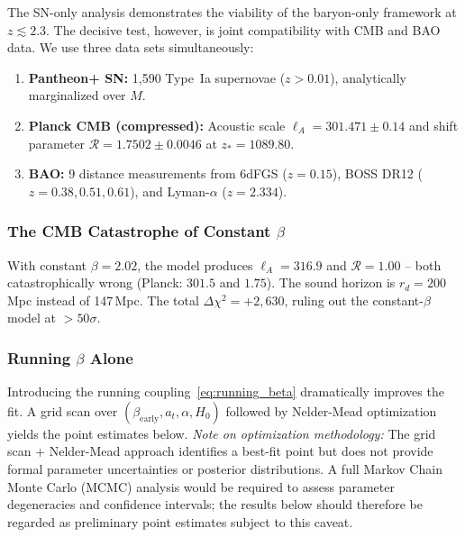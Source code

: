 \documentclass[aps,prd,twocolumn,superscriptaddress,nofootinbib,floatfix]{revtex4-2}
\begin{document}
The SN-only analysis demonstrates the viability of the baryon-only framework at $z \lesssim 2.3$. The decisive test, however, is joint compatibility with CMB and BAO data. We use three data sets simultaneously:

\begin{enumerate}
\item \textbf{Pantheon+ SN:} 1,590 Type~Ia supernovae ($z > 0.01$), analytically marginalized over $M$.
\item \textbf{Planck CMB (compressed):} Acoustic scale $\ell_A = 301.471 \pm 0.14$ and shift parameter $\mathcal{R} = 1.7502 \pm 0.0046$ at $z_* = 1089.80$.
\item \textbf{BAO:} 9 distance measurements from 6dFGS ($z = 0.15$), BOSS DR12 \cite{Alam2017} ($z = 0.38, 0.51, 0.61$), and Lyman-$\alpha$ ($z = 2.334$).
\end{enumerate}

\subsubsection{The CMB Catastrophe of Constant \texorpdfstring{$\beta$}{beta}}

With constant $\beta = 2.02$, the model produces $\ell_A = 316.9$ and $\mathcal{R} = 1.00$ -- both catastrophically wrong (Planck: $301.5$ and $1.75$). The sound horizon is $r_d = 200$\,Mpc instead of 147\,Mpc. The total $\Delta\chi^2 = +2{,}630$, ruling out the constant-$\beta$ model at $>50\sigma$.

\subsubsection{Running \texorpdfstring{$\beta$}{beta} Alone}

Introducing the running coupling~\eqref{eq:running_beta} dramatically improves the fit. A grid scan over $(\beta_{\mathrm{early}}, a_t, \alpha, H_0)$ followed by Nelder-Mead optimization yields the point estimates below. \textit{Note on optimization methodology:} The grid scan + Nelder-Mead approach identifies a best-fit point but does not provide formal parameter uncertainties or posterior distributions. A full Markov Chain Monte Carlo (MCMC) analysis would be required to assess parameter degeneracies and confidence intervals; the results below should therefore be regarded as preliminary point estimates subject to this caveat.
\end{document}

